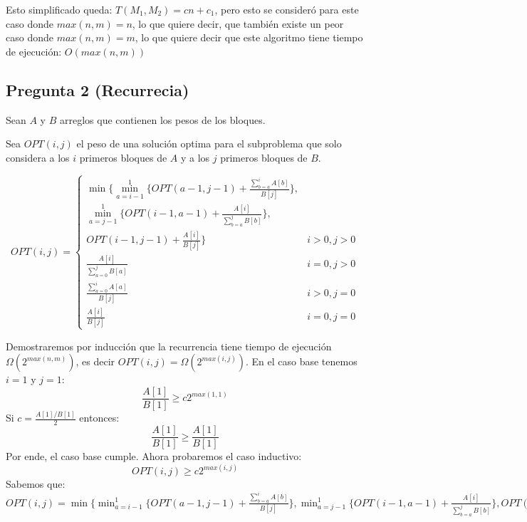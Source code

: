 \documentclass[12pt]{article}
\begin{document}
Esto simplificado queda: $T(M_1,M_2) = cn+c_1$, pero esto se consideró para este caso donde $max(n,m) = n$, lo que quiere decir, que también existe un peor caso donde $max(n,m) = m$, lo que quiere decir que este algoritmo tiene tiempo de ejecución: $O(max(n,m))$

\newpage
\subsection*{Pregunta 2 (Recurrecia)}

Sean $A$ y $B$ arreglos que contienen los pesos de los bloques.

Sea $OPT(i, j)$ el peso de una solución optima para el subproblema que solo considera a los $i$ primeros bloques de $A$ y a los $j$ primeros bloques de $B$.

\begin{equation*}
OPT(i,j) =
\begin{cases}
\min \{ \min_{a=i-1}^{1} \{OPT(a-1,j-1) + \frac{\sum_{b=a}^{i} A[b]}{B[j]}\}, \\
        \min_{a=j-1}^{1} \{OPT(i-1,a-1) + \frac{A[i]}{\sum_{b=a}^{j} B[b]}\}, \\
        OPT(i-1,j-1) + \frac{A[i]}{B[j]}\} & i > 0, j > 0\\

\frac{A[i]}{\sum_{a=0}^{j} B[a]} & i = 0, j > 0\\
\frac{\sum_{a=0}^{i} A[a]}{B[j]} & i > 0, j = 0\\
\frac{A[i]}{B[j]} & i = 0, j = 0 
\end{cases}
\end{equation*}

Demostraremos por inducción que la recurrencia tiene tiempo de ejecución $\Omega(2^{max(n,m)})$, es decir $OPT(i,j) = \Omega(2^{max(i,j)})$.
En el caso base tenemos $i = 1$ y $j = 1$:
$$\frac{A[1]}{B[1]} \geq c2^{max(1,1)}$$
Si $c=\frac{A[1]/B[1]}{2}$ entonces:
$$\frac{A[1]}{B[1]} \geq \frac{A[1]}{B[1]}$$
Por ende, el caso base cumple. Ahora probaremos el caso inductivo:
$$OPT(i,j) \geq c2^{max(i,j)}$$
Sabemos que:
$OPT(i,j) = \min \{ \min_{a=i-1}^{1} \{OPT(a-1,j-1) + \frac{\sum_{b=a}^{i} A[b]}{B[j]}\}, \min_{a=j-1}^{1} \{OPT(i-1,a-1) + \frac{A[i]}{\sum_{b=a}^{j} B[b]}\}, OPT(i-1,j-1) + \frac{A[i]}{B[j]}\}$
\end{document}
